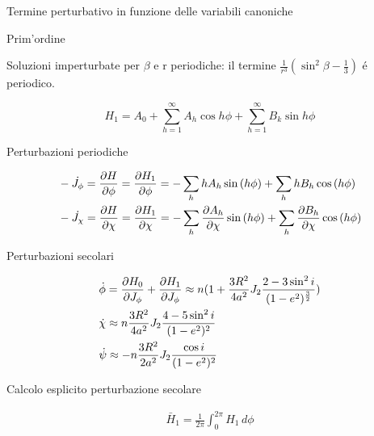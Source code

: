 \begin{frame}{Termine perturbativo in funzione delle variabili canoniche}


\begin{block}{Prim'ordine}

Soluzioni imperturbate per $\beta$ e r periodiche: il termine $\frac{1}{r^3}(\sin^2{\beta}-\frac{1}{3})$ \'e periodico.

\begin{equation*}
H_1=A_0+\sum_{h=1}^{\infty}A_h\cos{h\phi}+\sum_{h=1}^{\infty}B_k\sin{h\phi}
\end{equation*}


\end{block}

\begin{block}{Perturbazioni periodiche}

\begin{align*}
&-\dot{J_{\phi}}=\PDy{\phi}{H}=\PDy{\phi}{H_1}=-\sum_hhA_h\sin{(h\phi)}+\sum_hhB_h\cos{(h\phi)}\\
&-\dot{J_{\chi}}=\PDy{\chi}{H}=\PDy{\chi}{H_1}=-\sum_h\PDy{\chi}{A_h}\sin{(h\phi)}+\sum_h\PDy{\chi}{B_h}\cos{(h\phi)}
\end{align*}


\end{block}

\end{frame}


\begin{frame}{Perturbazioni secolari}

\begin{align*}
&\dot{\phi}=\PDy{J_{\phi}}{H_0}+\PDy{J_{\phi}}{H_1}\approx n(1+\frac{3R^2}{4a^2}J_2\frac{2-3\sin^2{i}}{(1-e^2)\expy{\frac{3}{2}}})\\
&\dot{\chi}\approx n\frac{3R^2}{4a^2}J_2\frac{4-5\sin^2{i}}{(1-e^2)^2}\\
&\dot{\psi}\approx-n\frac{3R^2}{2a^2}J_2\frac{\cos{i}}{(1-e^2)^2}
\end{align*}


\end{frame}

\begin{wordonframe}{Calcolo esplicito perturbazione secolare}

\begin{align*}
\bar{H}_1=\frac{1}{2\pi}\int_0^{2\pi}H_1\,d\phi
\end{align*}

\end{wordonframe}


